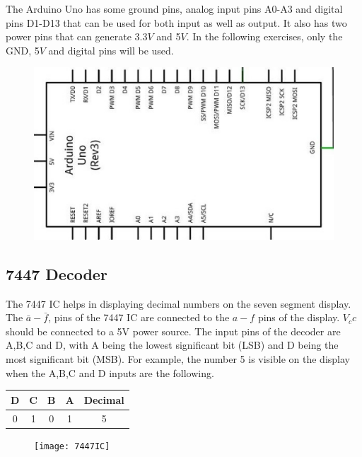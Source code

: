The Arduino Uno has some ground pins, analog input pins A0-A3 and digital pins D1-D13 that can be used for both input as well as output. It also has two power pins that can generate 3.3$V$ and 5$V$.  In the following exercises, only the GND, 5$V$ and digital pins will be used.
%
\begin{figure}
\begin{center}
\includegraphics[width=\columnwidth]{arduino}
\end{center}
\caption{}
\label{fig:arduino}
\end{figure}


\subsection{7447 Decoder}

The 7447 IC helps in displaying decimal numbers on the seven segment display.  The $\bar{a}-\bar{f}$, pins of the 7447 IC are connected to the $a-f$ pins of the display. $V_cc$ should be connected to a 5V power source. The input pins of the decoder are A,B,C and D, with A being the lowest significant bit (LSB) and D being the most significant bit (MSB).  For example, the number 5 is visible on the display when the A,B,C and D inputs are the following.
\begin{center}
	\begin{tabular}{|c|c|c|c|c|}
\hline
D & C & B & A & Decimal
\\ \hline
0 & 1 & 0 & 1 & 5
\\
\hline
\end{tabular}
\end{center}
%
%
\begin{figure}
\begin{center}
\texttt{[image: 7447IC]}
\end{center}
\caption{}
\label{fig:7447IC}
\end{figure}

